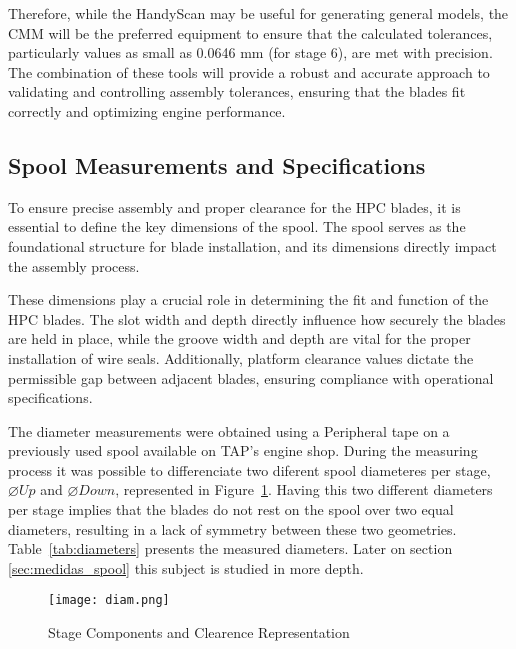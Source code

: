 Therefore, while the HandyScan may be useful for generating general models, the CMM will be the preferred equipment to ensure that the calculated tolerances, particularly values as small as 0.0646 mm (for stage 6), are met with precision. The combination of these tools will provide a robust and accurate approach to validating and controlling assembly tolerances, ensuring that the blades fit correctly and optimizing engine performance.

\subsection{Spool Measurements and Specifications}
\label{subsec:spool_measurements}

To ensure precise assembly and proper clearance for the HPC blades, it is essential to define the key dimensions of the spool. The spool serves as the foundational structure for blade installation, and its dimensions directly impact the assembly process. 

These dimensions play a crucial role in determining the fit and function of the HPC blades. The slot width and depth directly influence how securely the blades are held in place, while the groove width and depth are vital for the proper installation of wire seals.
Additionally, platform clearance values dictate the permissible gap between adjacent blades, ensuring compliance with operational specifications.

The diameter measurements were obtained using a Peripheral tape on a previously used spool available on \gls{TAP}'s engine shop. 
During the measuring process it was possible to differenciate two diferent spool diameteres per stage,$\varnothing Up$ and $\varnothing Down$, represented in Figure~\ref{fig:diam.png}.
Having this two different diameters per stage implies that the blades do not rest on the spool over two equal diameters, resulting in a lack of symmetry between these two geometries.
Table~\ref{tab:diameters} presents the measured diameters. Later on section \ref{sec:medidas_spool} this subject is studied in more depth.

\begin{figure}[H]
    \centering
    \texttt{[image: diam.png]}
    \caption{Stage Components and Clearence Representation}
    \label{fig:diam.png}
\end{figure}


